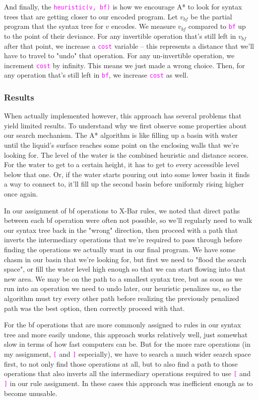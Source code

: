 \documentclass[runningheads]{llncs}
\newcommand{\code}[1]{\texttt{\textcolor{magenta}{\setlength{\fboxsep}{1pt}\colorbox{lightgray!20}{#1}}}}
\begin{document}
And finally, the \code{heuristic(v, bf)} is how we encourage A* to look for syntax trees that are getting closer to our encoded program. Let $v_{bf}$ be the partial program that the syntax tree for $v$ encodes. We measure $v_{bf}$ compared to \code{bf} up to the point of their deviance. For any invertible operation that's still left in $v_{bf}$ after that point, we increase a \code{cost} variable -- this represents a distance that we'll have to travel to "undo" that operation. For any un-invertible operation, we increment \code{cost} by infinity. This means we just made a wrong choice. Then, for any operation that's still left in \code{bf}, we increase \code{cost} as well.

\subsubsection*{Results}
When actually implemented however, this approach has several problems that yield limited results. To understand why we first observe some properties about our search mechanism. The A* algorithm  is like filling up a basin with water until the liquid's surface reaches some point on the enclosing walls that we're looking for. The level of the water is the combined heuristic and distance scores. For the water to get to a certain height, it has to get to every accessible level below that one. Or, if the water starts pouring out into some lower basin it finds a way to connect to, it'll fill up the second basin before uniformly rising higher once again.

In our assignment of bf operations to X-Bar rules, we noted that direct paths between each bf operation were often not possible, so we'll regularly need to walk our syntax tree back in the "wrong" direction, then proceed with a path that inverts the intermediary operations that we're required to pass through before finding the operations we actually want in our final program. We have some chasm in our basin that we're looking for, but first we need to "flood the search space", or fill the water level high enough so that we can start flowing into that new area. We may be on the path to a smallest syntax tree, but as soon as we run into an operation we need to undo later, our heuristic penalizes us, so the algorithm must try every other path before realizing the previously penalized path was the best option, then correctly proceed with that.

For the bf operations that are more commonly assigned to rules in our syntax tree and more easily undone, this approach works relatively well, just somewhat slow in terms of how fast computers can be. But for the more rare operations (in my assignment, \code{[} and \code{]} especially), we have to search a much wider search space first, to not only find those operations at all, but to also find a path to those operations that also inverts all the intermediary operations required to use \code{[} and \code{]} in our rule assignment. In these cases this approach was inefficient enough as to become unusable.
\end{document}
